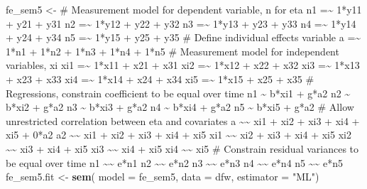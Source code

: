 \documentclass[]{interact}
\theoremstyle{plain}%
\theoremstyle{definition}
\theoremstyle{remark}
\newenvironment{Shaded}{\begin{snugshade}}{\end{snugshade}}
\newcommand{\DataTypeTok}[1]{\textcolor[rgb]{0.13,0.29,0.53}{#1}}
\newcommand{\KeywordTok}[1]{\textcolor[rgb]{0.13,0.29,0.53}{\textbf{#1}}}
\newcommand{\NormalTok}[1]{#1}
\newcommand{\StringTok}[1]{\textcolor[rgb]{0.31,0.60,0.02}{#1}}
\begin{document}
\begin{Shaded}
\begin{Highlighting}[numbers=left,,]
\NormalTok{fe\_sem5 \textless{}{-}}\StringTok{ \textquotesingle{}}
\StringTok{\# Measurement model for dependent variable, n for eta}
\StringTok{n1 =\textasciitilde{} 1*y11 + y21 + y31}
\StringTok{n2 =\textasciitilde{} 1*y12 + y22 + y32}
\StringTok{n3 =\textasciitilde{} 1*y13 + y23 + y33}
\StringTok{n4 =\textasciitilde{} 1*y14 + y24 + y34}
\StringTok{n5 =\textasciitilde{} 1*y15 + y25 + y35}
\StringTok{\# Define individual effects variable }
\StringTok{a =\textasciitilde{} 1*n1 + 1*n2 + 1*n3 + 1*n4 + 1*n5}
\StringTok{\# Measurement model for independent variables, xi }
\StringTok{xi1 =\textasciitilde{} 1*x11 + x21 + x31 }
\StringTok{xi2 =\textasciitilde{} 1*x12 + x22 + x32}
\StringTok{xi3 =\textasciitilde{} 1*x13 + x23 + x33}
\StringTok{xi4 =\textasciitilde{} 1*x14 + x24 + x34}
\StringTok{xi5 =\textasciitilde{} 1*x15 + x25 + x35}
\StringTok{\# Regressions, constrain coefficient to be equal over time}
\StringTok{n1 \textasciitilde{} b*xi1 + g*a2}
\StringTok{n2 \textasciitilde{} b*xi2 + g*a2}
\StringTok{n3 \textasciitilde{} b*xi3 + g*a2}
\StringTok{n4 \textasciitilde{} b*xi4 + g*a2}
\StringTok{n5 \textasciitilde{} b*xi5 + g*a2}
\StringTok{\# Allow unrestricted correlation between eta and covariates}
\StringTok{a \textasciitilde{}\textasciitilde{} xi1 + xi2 + xi3 + xi4 + xi5 + 0*a2}
\StringTok{a2 \textasciitilde{}\textasciitilde{} xi1 + xi2 + xi3 + xi4 + xi5}
\StringTok{xi1 \textasciitilde{}\textasciitilde{} xi2 + xi3 + xi4 + xi5}
\StringTok{xi2 \textasciitilde{}\textasciitilde{} xi3 + xi4 + xi5}
\StringTok{xi3 \textasciitilde{}\textasciitilde{} xi4 + xi5}
\StringTok{xi4 \textasciitilde{}\textasciitilde{} xi5}
\StringTok{\# Constrain residual variances to be equal over time}
\StringTok{n1 \textasciitilde{}\textasciitilde{} e*n1}
\StringTok{n2 \textasciitilde{}\textasciitilde{} e*n2}
\StringTok{n3 \textasciitilde{}\textasciitilde{} e*n3}
\StringTok{n4 \textasciitilde{}\textasciitilde{} e*n4}
\StringTok{n5 \textasciitilde{}\textasciitilde{} e*n5}
\StringTok{\textquotesingle{}}
\NormalTok{fe\_sem5.fit \textless{}{-}}\StringTok{ }\KeywordTok{sem}\NormalTok{( }\DataTypeTok{model =}\NormalTok{ fe\_sem5, }
                    \DataTypeTok{data =}\NormalTok{ dfw, }
                    \DataTypeTok{estimator =} \StringTok{"ML"}\NormalTok{)}
\end{Highlighting}
\end{Shaded}

\doublespacing
\end{document}
